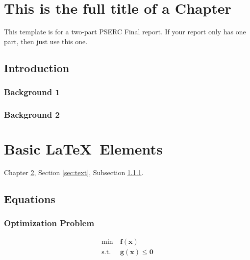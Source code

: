 \documentclass[letterpaper, 12pt, oneside]{book}
\theoremstyle{plain}
\theoremstyle{definition}
\theoremstyle{remark}
\begin{document}



\chapter[Short Chapter Title]{This is the full title of a Chapter}
\label{chap:chapter1}
This template is for a two-part PSERC Final report. If your report only has one part, then just use this one.
\section{Introduction} %
\label{sec:introduction}

\subsection{Background 1} %
\label{sub:background_1}


\subsection{Background 2} %
\label{sub:background_2}



\chapter[Table, Figures, and Equations]{Basic \LaTeX~Elements}
\label{chap:chapter2}
Chapter \ref{chap:chapter2}, Section \ref{sec:text}, Subsection \ref{sub:background_1}.


\section{Equations} %
\label{sec:equations}
\subsection{Optimization Problem} %
\label{sub:optimization_problem}
\begin{subequations}
\begin{align}
\min~& \bm{f}(\bm{x}) \\
\text{s.t.}~& \bm{g}(\bm{x}) \le \bm{0}
\end{align}
\end{subequations}
\end{document}
